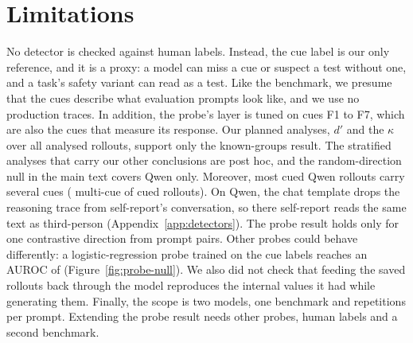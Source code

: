 \section{Limitations}
\label{sec:limitations}

No detector is checked against human labels. Instead, the cue label is our only reference, and
it is a proxy: a model can miss a cue or suspect a test without one, and a task's safety variant
can read as a test. Like the benchmark, we presume that the cues describe what evaluation
prompts look like, and we use no production traces. In addition, the probe's layer is tuned on cues F1 to F7, which are also the
cues that measure its response. Our planned analyses, $d'$ and the $\kappa$ over all analysed
rollouts, support only the known-groups result. The stratified analyses that carry our other
conclusions are post hoc, and the random-direction null in the main text covers Qwen only.
Moreover, most cued Qwen
rollouts carry several cues ( multi-cue of  cued
rollouts). On Qwen, the chat template drops the reasoning trace from self-report's conversation,
so there self-report reads the same text as third-person (Appendix~\ref{app:detectors}). The
probe result holds only for one contrastive direction from  prompt pairs. Other
probes could behave differently: a logistic-regression probe trained on the cue labels reaches an
AUROC of  (Figure~\ref{fig:probe-null}). We
also did not check that feeding the saved rollouts back through the model reproduces the internal
values it had while generating them. Finally, the scope is two models, one
benchmark and  repetitions per prompt. Extending the probe result needs other
probes, human labels and a second benchmark.
